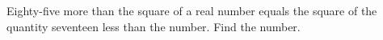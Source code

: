 Eighty-five more than the square of a real number equals the square of the quantity seventeen less than the number. Find the number.
